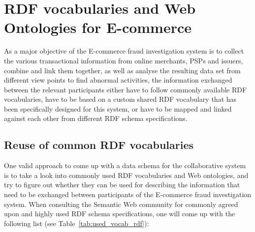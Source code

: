 
\section{\gls{RDF} vocabularies and Web Ontologies for \gls{E-commerce}}
\label{sec:choose_data_schema}

As a major objective of the \gls{E-commerce} fraud investigation system is to collect the various transactional information from online merchants, \gls{PSP}s and issuers, combine and link them together, as well as analyse the resulting data set from different view points to find abnormal activities, the information exchanged between the relevant participants either have to follow commonly available \gls{RDF} vocabularies, have to be based on a custom shared \gls{RDF} vocabulary that has been specifically designed for this system, or have to be mapped and linked against each other from different \gls{RDF} schema specifications.

\subsection{Reuse of common \gls{RDF} vocabularies}
\label{subsec:reuse_vocab_web}

One valid approach to come up with a data schema for the collaborative system is to take a look into commonly used \gls{RDF} vocabularies and Web ontologies, and try to figure out whether they can be used for describing the information that need to be exchanged between participants of the \gls{E-commerce} fraud investigation system. When consulting the Semantic Web community for commonly agreed upon and highly used \gls{RDF} schema specifications, one will come up with the following list (see Table~\ref{tab:used_vocab_rdf}):\@

